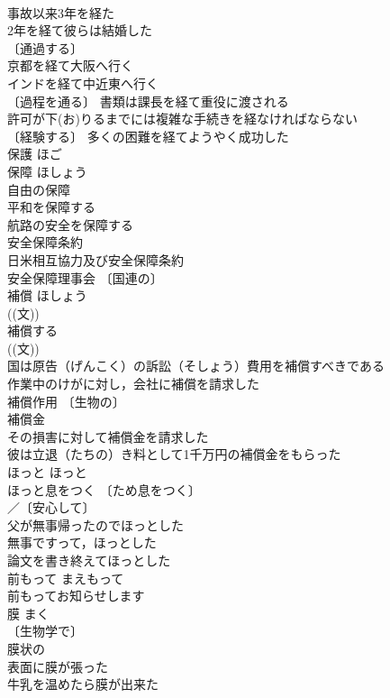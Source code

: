 \documentclass[8pt]{extreport}
\begin{document}
\begin{CJK}{UTF8}{min}
\\	事故以来3年を経た 
\\	2年を経て彼らは結婚した 
\\	〔通過する〕
\\	京都を経て大阪へ行く 
\\	インドを経て中近東へ行く 
\\	〔過程を通る〕 書類は課長を経て重役に渡される 
\\	許可が下(お)りるまでには複雑な手続きを経なければならない 
\\	〔経験する〕 多くの困難を経てようやく成功した 
\\	保護	ほご	
\\	保障	ほしょう	
\\	自由の保障 
\\	平和を保障する 
\\	航路の安全を保障する 
\\	安全保障条約 
\\	日米相互協力及び安全保障条約 
\\	安全保障理事会 〔国連の〕
\\	補償	ほしょう	
\\	((文)) 
\\	補償する 
\\	((文)) 
\\	国は原告（げんこく）の訴訟（そしょう）費用を補償すべきである 
\\	作業中のけがに対し，会社に補償を請求した 
\\	補償作用 〔生物の〕
\\	補償金 
\\	その損害に対して補償金を請求した 
\\	彼は立退（たちの）き料として1千万円の補償金をもらった 
\\	ほっと	ほっと	
\\	ほっと息をつく 〔ため息をつく〕
\\	／〔安心して〕
\\	父が無事帰ったのでほっとした 
\\	無事ですって，ほっとした 
\\	論文を書き終えてほっとした 
\\	前もって	まえもって	
\\	前もってお知らせします 
\\	膜	まく	
\\	〔生物学で〕
\\	膜状の 
\\	表面に膜が張った 
\\	牛乳を温めたら膜が出来た 

\end{CJK}
\end{document}
